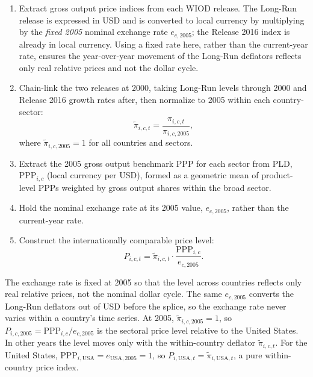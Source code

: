 \documentclass{article}
\begin{document}
\begin{enumerate}
    \item Extract gross output price indices from each WIOD release. The Long-Run release is
    expressed in USD and is converted to local currency by multiplying by the \emph{fixed 2005}
    nominal exchange rate $e_{c,2005}$; the Release 2016 index is already in local currency. Using a
    fixed rate here, rather than the current-year rate, ensures the year-over-year movement of the
    Long-Run deflators reflects only real relative prices and not the dollar cycle.

    \item Chain-link the two releases at 2000, taking Long-Run levels through 2000 and Release 2016
    growth rates after, then normalize to 2005 within each country-sector:
    \begin{equation}
        \tilde{\pi}_{i,c,t} = \frac{\pi_{i,c,t}}{\pi_{i,c,2005}},
    \end{equation}
    where $\tilde{\pi}_{i,c,2005} = 1$ for all countries and sectors.

    \item Extract the 2005 gross output benchmark PPP for each sector from PLD, $\text{PPP}_{i,c}$
    (local currency per USD), formed as a geometric mean of product-level PPPs weighted by gross
    output shares within the broad sector.

    \item Hold the nominal exchange rate at its 2005 value, $e_{c,2005}$, rather than the
    current-year rate.

    \item Construct the internationally comparable price level:
    \begin{equation}
        P_{i,c,t} = \tilde{\pi}_{i,c,t} \cdot \frac{\text{PPP}_{i,c}}{e_{c,2005}}.
    \end{equation}
\end{enumerate}

The exchange rate is fixed at 2005 so that the level across countries reflects only real relative
prices, not the nominal dollar cycle. The same $e_{c,2005}$ converts the Long-Run deflators out of
USD before the splice, so the exchange rate never varies within a country's time series. At 2005,
$\tilde{\pi}_{i,c,2005}=1$, so
$P_{i,c,2005}=\text{PPP}_{i,c}/e_{c,2005}$ is the sectoral price level relative to the United States.
In other years the level moves only with the within-country deflator $\tilde{\pi}_{i,c,t}$. For the
United States, $\text{PPP}_{i,\text{USA}}=e_{\text{USA},2005}=1$, so $P_{i,\text{USA},t}=\tilde{\pi}_{i,\text{USA},t}$,
a pure within-country price index.
\end{document}
